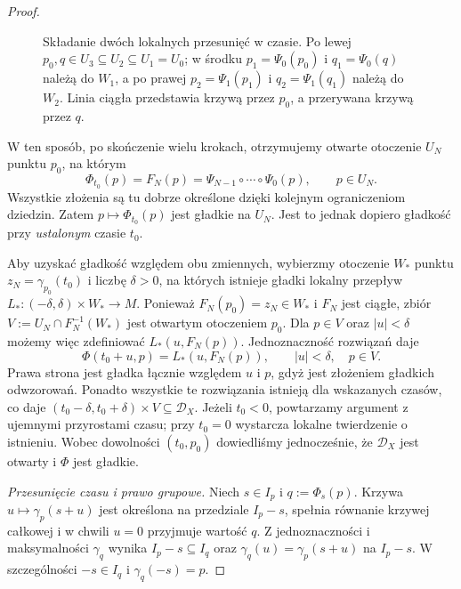\begin{proof}
\begin{figure}[H]

\caption{Składanie dwóch lokalnych przesunięć w czasie.
Po lewej $p_0,q\in U_3\subseteq U_2\subseteq U_1=U_0$;
w środku $p_1=\Psi_0(p_0)$ i $q_1=\Psi_0(q)$
należą do $W_1$, a po prawej $p_2=\Psi_1(p_1)$
i $q_2=\Psi_1(q_1)$ należą do $W_2$.
Linia ciągła przedstawia krzywą przez $p_0$,
a przerywana krzywą przez $q$.}
\label{fig:przeplyw-skladanie-lokalne}
\end{figure}

W ten sposób, po skończenie wielu krokach, otrzymujemy otwarte
otoczenie $U_N$ punktu $p_0$, na którym
\[
\Phi_{t_0}(p)=F_N(p)
=\Psi_{N-1}\circ\cdots\circ\Psi_0(p),\qquad p\in U_N.
\]
Wszystkie złożenia są tu dobrze określone dzięki kolejnym
ograniczeniom dziedzin. Zatem $p\mapsto\Phi_{t_0}(p)$ jest gładkie
na $U_N$. Jest to jednak dopiero gładkość przy \emph{ustalonym}
czasie $t_0$.

Aby uzyskać gładkość względem obu zmiennych, wybierzmy otoczenie
$W_*$ punktu $z_N=\gamma_{p_0}(t_0)$ i liczbę $\delta>0$,
na których istnieje gładki lokalny przepływ
$L_*\colon(-\delta,\delta)\times W_*\to M$.
Ponieważ $F_N(p_0)=z_N\in W_*$ i $F_N$ jest ciągłe, zbiór
$V:=U_N\cap F_N^{-1}(W_*)$ jest otwartym otoczeniem $p_0$.
Dla $p\in V$ oraz $|u|<\delta$ możemy więc zdefiniować
$L_*(u,F_N(p))$. Jednoznaczność rozwiązań daje
\[
\Phi(t_0+u,p)=L_*(u,F_N(p)),
\qquad |u|<\delta,\quad p\in V.
\]
Prawa strona jest gładka łącznie względem $u$ i $p$,
gdyż jest złożeniem gładkich odwzorowań.
Ponadto wszystkie te rozwiązania istnieją dla wskazanych czasów,
co daje $(t_0-\delta,t_0+\delta)\times V\subseteq\mathcal D_X$.
Jeżeli $t_0<0$, powtarzamy argument z ujemnymi przyrostami czasu;
przy $t_0=0$ wystarcza lokalne twierdzenie o istnieniu.
Wobec dowolności $(t_0,p_0)$ dowiedliśmy jednocześnie, że
$\mathcal D_X$ jest otwarty i $\Phi$ jest gładkie.

\medskip
\noindent\emph{Przesunięcie czasu i prawo grupowe.}
Niech $s\in I_p$ i $q:=\Phi_s(p)$. Krzywa
$u\mapsto\gamma_p(s+u)$ jest określona na przedziale $I_p-s$,
spełnia równanie krzywej całkowej i w chwili $u=0$ przyjmuje
wartość $q$. Z jednoznaczności i maksymalności $\gamma_q$
wynika $I_p-s\subseteq I_q$ oraz
$\gamma_q(u)=\gamma_p(s+u)$ na $I_p-s$.
W szczególności $-s\in I_q$ i $\gamma_q(-s)=p$.


\end{proof}
